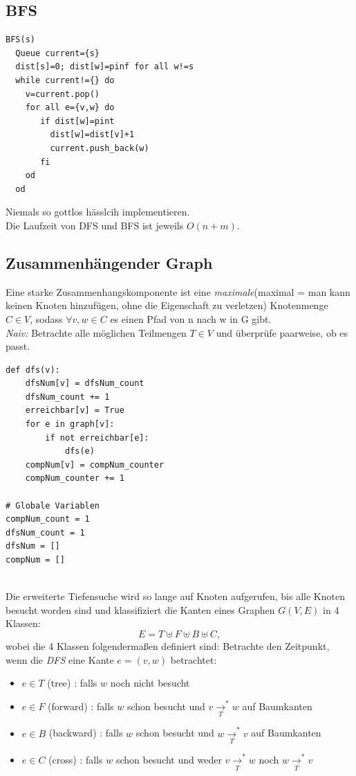 \documentclass{article}
\begin{document}
\subsection{BFS}
\begin{verbatim}
BFS(s)
  Queue current={s}
  dist[s]=0; dist[w]=pinf for all w!=s
  while current!={} do
    v=current.pop()
    for all e={v,w} do
       if dist[w]=pint
         dist[w]=dist[v]+1
         current.push_back(w)
       fi
    od
  od
\end{verbatim}
Niemals so gottlos hässlcih implementieren.\\
Die Laufzeit von DFS und BFS ist jeweils $O(n+m)$.

\subsection{Zusammenhängender Graph}
Eine starke Zusammenhangskomponente ist eine \textit{maximale}(maximal = man kann keinen Knoten hinzufügen, ohne die Eigenschaft zu verletzen) Knotenmenge $C \in V$, sodass $\forall v,w \in C$ es einen Pfad von n nach w in G gibt. \\
\newline
\textit{Naiv:} Betrachte alle möglichen Teilmengen $T \in V$ und überprüfe paarweise, ob es passt. \\
\begin{verbatim}
def dfs(v):
    dfsNum[v] = dfsNum_count
    dfsNum_count += 1
    erreichbar[v] = True
    for e in graph[v]:
        if not erreichbar[e]:
            dfs(e)
    compNum[v] = compNum_counter
    compNum_counter += 1

# Globale Variablen
compNum_count = 1
dfsNum_count = 1
dfsNum = []
compNum = []
\end{verbatim} \\
\newline
Die erweiterte Tiefensuche wird so lange auf Knoten aufgerufen, bis alle Knoten
besucht worden sind und klassifiziert die Kanten eines Graphen $G(V,E)$ in 4 Klassen:
$$ E=T\uplus F\uplus B\uplus C,$$
wobei die 4 Klassen folgenderma\ss en definiert sind: Betrachte den Zeitpunkt, wenn die \textit{DFS} eine Kante $e = (v,w)$ betrachtet:
\begin{itemize}
	\item $e\in T$ (tree) : falls $w$ noch nicht besucht
	\item $e\in F$ (forward) : falls $w$ schon besucht und $v\xrightarrow[T]{}^*w$ auf Baumkanten
	\item $e\in B$ (backward) : falls $w$ schon besucht und $w\xrightarrow[T]{}^*v$ auf Baumkanten
	\item $e\in C$ (cross) : falls $w$ schon besucht und weder $v\xrightarrow[T]{}^*w$ noch $w\xrightarrow[T]{}^*v$
\end{itemize}
\end{document}
